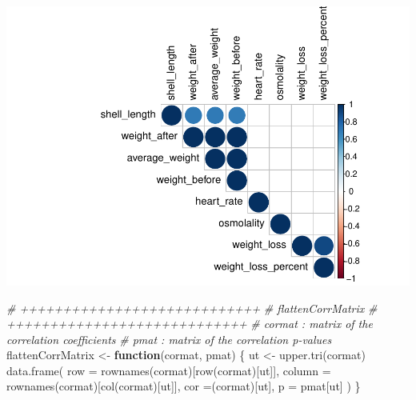 \documentclass[
]{article}
\newenvironment{Shaded}{\begin{snugshade}}{\end{snugshade}}
\newcommand{\AttributeTok}[1]{\textcolor[rgb]{0.77,0.63,0.00}{#1}}
\newcommand{\CommentTok}[1]{\textcolor[rgb]{0.56,0.35,0.01}{\textit{#1}}}
\newcommand{\ControlFlowTok}[1]{\textcolor[rgb]{0.13,0.29,0.53}{\textbf{#1}}}
\newcommand{\FloatTok}[1]{\textcolor[rgb]{0.00,0.00,0.81}{#1}}
\newcommand{\FunctionTok}[1]{\textcolor[rgb]{0.00,0.00,0.00}{#1}}
\newcommand{\NormalTok}[1]{#1}
\newcommand{\OtherTok}[1]{\textcolor[rgb]{0.56,0.35,0.01}{#1}}
\newcommand{\SpecialCharTok}[1]{\textcolor[rgb]{0.00,0.00,0.00}{#1}}
\newcommand{\StringTok}[1]{\textcolor[rgb]{0.31,0.60,0.02}{#1}}
\begin{document}
\begin{Shaded}
\end{Shaded}

\includegraphics{physiology_stats_files/figure-latex/unnamed-chunk-5-1.pdf}

\begin{Shaded}
\begin{Highlighting}[]
\CommentTok{\# ++++++++++++++++++++++++++++}
\CommentTok{\# flattenCorrMatrix}
\CommentTok{\# ++++++++++++++++++++++++++++}
\CommentTok{\# cormat : matrix of the correlation coefficients}
\CommentTok{\# pmat : matrix of the correlation p{-}values}
\NormalTok{flattenCorrMatrix }\OtherTok{\textless{}{-}} \ControlFlowTok{function}\NormalTok{(cormat, pmat) \{}
\NormalTok{  ut }\OtherTok{\textless{}{-}} \FunctionTok{upper.tri}\NormalTok{(cormat)}
  \FunctionTok{data.frame}\NormalTok{(}
    \AttributeTok{row =} \FunctionTok{rownames}\NormalTok{(cormat)[}\FunctionTok{row}\NormalTok{(cormat)[ut]],}
    \AttributeTok{column =} \FunctionTok{rownames}\NormalTok{(cormat)[}\FunctionTok{col}\NormalTok{(cormat)[ut]],}
    \AttributeTok{cor  =}\NormalTok{(cormat)[ut],}
    \AttributeTok{p =}\NormalTok{ pmat[ut]}
\NormalTok{    )}
\NormalTok{\}}
\end{Highlighting}
\end{Shaded}
\end{document}
